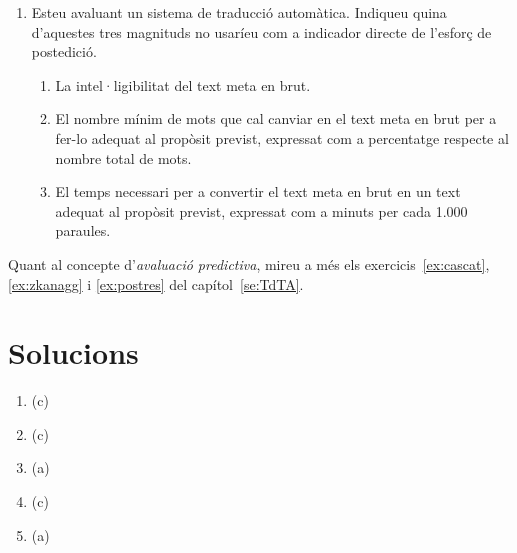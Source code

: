 \begin{enumerate}
\item Esteu avaluant un sistema de traducció automàtica. Indiqueu
  quina d'aquestes tres magnituds no usaríeu com a indicador directe
  de l'esforç de postedició.
  \begin{enumerate}
  \item La intel·ligibilitat del text meta en brut.
  \item El nombre mínim de mots que cal canviar en el text meta en
    brut per a fer-lo adequat al propòsit previst, expressat com a
    percentatge respecte al nombre total de mots.
  \item El temps necessari per a convertir el text
    meta en brut en un text adequat al propòsit previst, expressat com
    a minuts per cada 1.000 paraules.
  \end{enumerate}

\end{enumerate}

Quant al concepte d'\emph{avaluació predictiva}, mireu a més els
exercicis~\ref{ex:cascat}, \ref{ex:zkanagg} i \ref{ex:postres} del
capítol~\ref{se:TdTA}.


\section{Solucions}

\begin{enumerate}
\item (c)
\item (c)
\item (a)
\item (c)
\item (a)
\end{enumerate}


